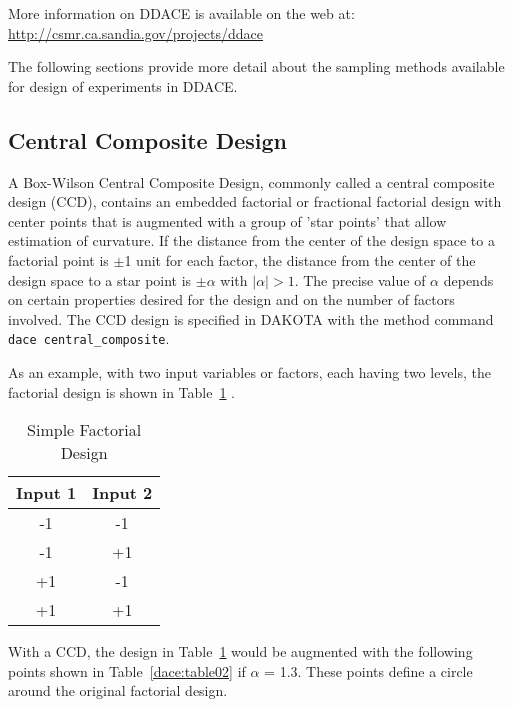 More information on DDACE is available on the web at:
\url{http://csmr.ca.sandia.gov/projects/ddace}

The following sections provide more detail about the sampling 
methods available for design of experiments in DDACE. 

\subsection{Central Composite Design}\label{dace:ccd}

A Box-Wilson Central Composite Design, commonly called a central
composite design (CCD), contains an embedded factorial or fractional
factorial design with center points that is augmented with a group of
'star points' that allow estimation of curvature.  If the distance
from the center of the design space to a factorial point is $\pm$1
unit for each factor, the distance from the center of the design space
to a star point is $\pm\alpha$ with $\mid\alpha\mid > 1$. The precise
value of $\alpha$ depends on certain properties desired for the design and on
the number of factors involved.  The CCD design is specified in DAKOTA
with the method command \texttt{dace central\_composite}.

As an example, with two input variables or factors, each having two 
levels, the factorial design is shown in Table~\ref{dace:table01} . 

\begin{table}[ht]
 \caption{Simple Factorial Design}
 \label{dace:table01}	
 \begin{center}
  \begin{tabular}{c|c}
  \hline
  Input 1            & Input 2         \\ \hline \hline 
  -1                 & -1             \\ \hline 
  -1                 & +1           \\ \hline
  +1                 & -1      \\ \hline
  +1                 & +1        \\ \hline
  \end{tabular}
\end{center}
\end{table}


With a CCD, the design in Table~\ref{dace:table01} would be augmented 
with the following points shown in Table~\ref{dace:table02} 
if $\alpha$ = 1.3. These points define a circle around the original  
factorial design.

